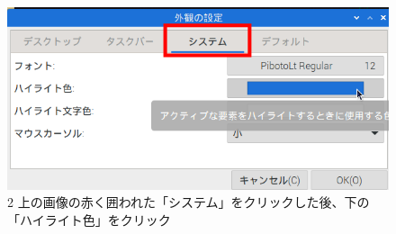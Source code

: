 \documentclass[a4paper,12pt]{jarticle}
\begin{document}
\begin{figure}
\begin{minipage}{\textwidth}
\begin{minipage}{2.582cm}
    \end{minipage}
    \begin{minipage}{0.45\linewidth}
      \includegraphics[width=\linewidth]{textbook-img1001.png}\\
      2 上の画像の赤く囲われた「システム」をクリックした後、下の「ハイライト色」をクリック
    \end{minipage}

  \end{minipage}

  \begin{minipage}{\textwidth}


\end{minipage}
\end{figure}
\end{document}
